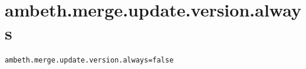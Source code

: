 \section{ambeth.merge.update.version.always}
\label{configuration:AmbethMergeUpdateVersionAlways}
\AvailableInJavaOnly{\TODO}
\begin{lstlisting}[style=Props,caption={Usage example for \textit{ambeth.merge.update.version.always}}]
ambeth.merge.update.version.always=false
\end{lstlisting}
